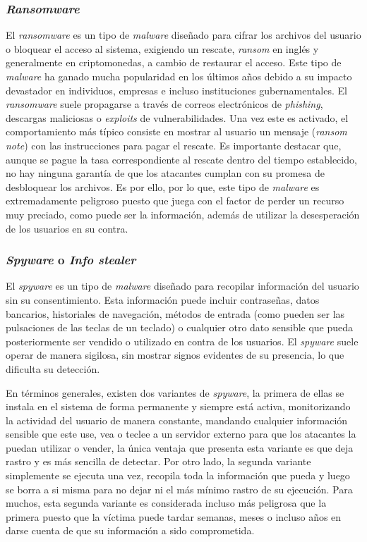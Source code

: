\subsubsection{\textit{Ransomware}}
El \textit{ransomware} es un tipo de \textit{malware} diseñado para cifrar los archivos del usuario o bloquear el acceso al sistema, exigiendo un rescate, \textit{ransom} en inglés y generalmente en criptomonedas, a cambio de restaurar el acceso. Este tipo de \textit{malware} ha ganado mucha popularidad en los últimos años debido a su impacto devastador en individuos, empresas e incluso instituciones gubernamentales. El \textit{ransomware} suele propagarse a través de correos electrónicos de \textit{phishing}, descargas maliciosas o \textit{exploits} de vulnerabilidades. Una vez este es activado, el comportamiento más típico consiste en mostrar al usuario un mensaje (\textit{ransom note}) con las instrucciones para pagar el rescate. Es importante destacar que, aunque se pague la tasa correspondiente al rescate dentro del tiempo establecido, no hay ninguna garantía de que los atacantes cumplan con su promesa de desbloquear los archivos. Es por ello, por lo que, este tipo de \textit{malware} es extremadamente peligroso puesto que juega con el factor de perder un recurso muy preciado, como puede ser la información, además de utilizar la desesperación de los usuarios en su contra.

\subsubsection{\textit{Spyware} o \textit{Info stealer}}
El \textit{spyware} es un tipo de \textit{malware} diseñado para recopilar información del usuario sin su consentimiento. Esta información puede incluir contraseñas, datos bancarios, historiales de navegación, métodos de entrada (como pueden ser las pulsaciones de las teclas de un teclado) o cualquier otro dato sensible que pueda posteriormente ser vendido o utilizado en contra de los usuarios. El \textit{spyware} suele operar de manera sigilosa, sin mostrar signos evidentes de su presencia, lo que dificulta su detección. 

En términos generales, existen dos variantes de \textit{spyware}, la primera de ellas se instala en el sistema de forma permanente y siempre está activa, monitorizando la actividad del usuario de manera constante, mandando cualquier información sensible que este use, vea o teclee a un servidor externo para que los atacantes la puedan utilizar o vender, la única ventaja que presenta esta variante es que deja rastro y es más sencilla de detectar. Por otro lado, la segunda variante simplemente se ejecuta una vez, recopila toda la información que pueda y luego se borra a si misma para no dejar ni el más mínimo rastro de su ejecución. Para muchos, esta segunda variante es considerada incluso más peligrosa que la primera puesto que la víctima puede tardar semanas, meses o incluso años en darse cuenta de que su información a sido comprometida. 

